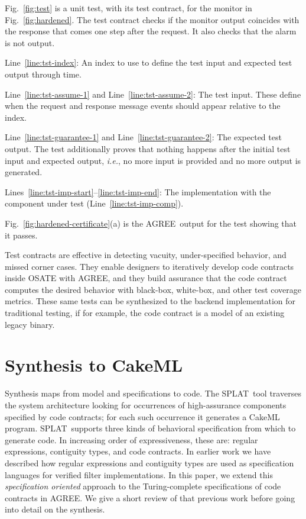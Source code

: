 \documentclass[global,twocolumn]{svjour}
\newcommand{\figref}[1]{Fig.~\ref{#1}}
\newcommand{\lineref}[1]{Line~\ref{#1}}
\newcommand{\linesref}[2]{Lines~\ref{#1}--\ref{#2}}
\newcommand{\agr}{AGREE}
\newcommand{\splt}{SPLAT}
\newcommand{\ie}{\textit{i.e.}}
\begin{document}
\figref{fig:test} is a unit test, with its test contract, for the monitor in \figref{fig:hardened}.
%
The test contract checks if the monitor output coincides with the response that comes one step after the request.
%
It also checks that the alarm is not output.
%
\begin{compactitem}
\item \lineref{line:tst-index}: An index to use to define the test input and expected test output through time.
\item \lineref{line:tst-assume-1} and \lineref{line:tst-assume-2}: The test input. These define when the request and response message events should appear relative to the index.
\item \lineref{line:tst-guarantee-1} and \lineref{line:tst-guarantee-2}: The expected test output.
The test additionally proves that nothing happens after the initial test input and expected output, \ie, no more input is provided and no more output is generated.
\item \linesref{line:tst-imp-start}{line:tst-imp-end}: The implementation with the component under test (\lineref{line:tst-imp-comp}).
\end{compactitem}
%
\figref{fig:hardened-certificate}(a) is the \agr\ output for the test showing that it passes.

Test contracts are effective in detecting vacuity, under-specified behavior, and missed corner cases.
%
They enable designers to iteratively develop code contracts inside OSATE with \agr, and they build assurance that the code contract computes the desired behavior with black-box, white-box, and other test coverage metrics.
%
These same tests can be synthesized to the backend implementation for traditional testing, if for example, the code contract is a model of an existing legacy binary.


\section{Synthesis to CakeML}
\label{sec:synthesis}

Synthesis maps from model and specifications to code.
%
The \splt\ tool traverses the system architecture looking for occurrences of high-assurance components specified by code contracts;
%
for each such occurrence it generates a CakeML program.
%
\splt\ supports three kinds of behavioral specification from which to generate code.
%
In increasing order of expressiveness, these are: regular expressions, contiguity types, and code contracts.
%
In earlier work we have described how regular expressions and contiguity types are used as specification languages for verified filter implementations.
%
In this paper, we extend this \emph{specification oriented} approach to the Turing-complete specifications of code contracts in \agr.
%
We give a short review of that previous work before going into detail on the synthesis.
\end{document}
